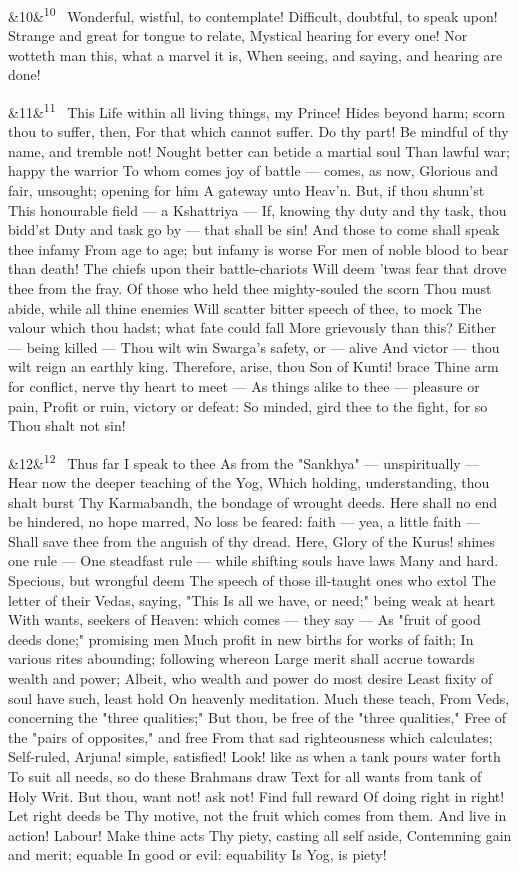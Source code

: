 \documentclass[12pt]{article}
\newcommand{\para}[1][]{\par\noindent\ifx&#1&\else\textsuperscript{\footnotesize #1}~\fi}
\begin{document}
\para[10] Wonderful, wistful, to contemplate! Difficult, doubtful, to speak upon! Strange and great for tongue to relate, Mystical hearing for every one! Nor wotteth man this, what a marvel it is, When seeing, and saying, and hearing are done!

\para[11] This Life within all living things, my Prince! Hides beyond harm; scorn thou to suffer, then, For that which cannot suffer. Do thy part! Be mindful of thy name, and tremble not! Nought better can betide a martial soul Than lawful war; happy the warrior To whom comes joy of battle --- comes, as now, Glorious and fair, unsought; opening for him A gateway unto Heav'n. But, if thou shunn'st This honourable field --- a Kshattriya --- If, knowing thy duty and thy task, thou bidd'st Duty and task go by --- that shall be sin! And those to come shall speak thee infamy From age to age; but infamy is worse For men of noble blood to bear than death! The chiefs upon their battle-chariots Will deem 'twas fear that drove thee from the fray. Of those who held thee mighty-souled the scorn Thou must abide, while all thine enemies Will scatter bitter speech of thee, to mock The valour which thou hadst; what fate could fall More grievously than this? Either --- being killed --- Thou wilt win Swarga's safety, or --- alive And victor --- thou wilt reign an earthly king. Therefore, arise, thou Son of Kunti! brace Thine arm for conflict, nerve thy heart to meet --- As things alike to thee --- pleasure or pain, Profit or ruin, victory or defeat: So minded, gird thee to the fight, for so Thou shalt not sin!

\para[12] Thus far I speak to thee As from the "Sankhya" --- unspiritually --- Hear now the deeper teaching of the Yog, Which holding, understanding, thou shalt burst Thy Karmabandh, the bondage of wrought deeds. Here shall no end be hindered, no hope marred, No loss be feared: faith --- yea, a little faith --- Shall save thee from the anguish of thy dread. Here, Glory of the Kurus! shines one rule --- One steadfast rule --- while shifting souls have laws Many and hard. Specious, but wrongful deem The speech of those ill-taught ones who extol The letter of their Vedas, saying, "This Is all we have, or need;" being weak at heart With wants, seekers of Heaven: which comes --- they say --- As "fruit of good deeds done;" promising men Much profit in new births for works of faith; In various rites abounding; following whereon Large merit shall accrue towards wealth and power; Albeit, who wealth and power do most desire Least fixity of soul have such, least hold On heavenly meditation. Much these teach, From Veds, concerning the "three qualities;" But thou, be free of the "three qualities," Free of the "pairs of opposites," and free From that sad righteousness which calculates; Self-ruled, Arjuna! simple, satisfied! Look! like as when a tank pours water forth To suit all needs, so do these Brahmans draw Text for all wants from tank of Holy Writ. But thou, want not! ask not! Find full reward Of doing right in right! Let right deeds be Thy motive, not the fruit which comes from them. And live in action! Labour! Make thine acts Thy piety, casting all self aside, Contemning gain and merit; equable In good or evil: equability Is Yog, is piety!
\end{document}
